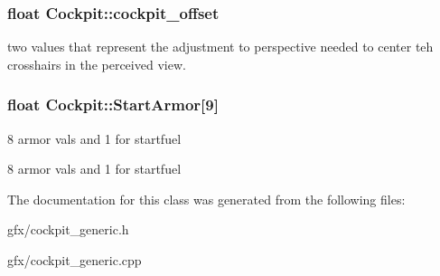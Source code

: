 \subsubsection[{\texorpdfstring{cockpit\+\_\+offset}{cockpit_offset}}]{\setlength{\rightskip}{0pt plus 5cm}float Cockpit\+::cockpit\+\_\+offset\hspace{0.3cm}{\ttfamily [protected]}}\hypertarget{classCockpit_abfd38e7f629da18799014c03912a8f7d}{}\label{classCockpit_abfd38e7f629da18799014c03912a8f7d}
two values that represent the adjustment to perspective needed to center teh crosshairs in the perceived view. 
\subsubsection[{\texorpdfstring{Start\+Armor}{StartArmor}}]{\setlength{\rightskip}{0pt plus 5cm}float Cockpit\+::\+Start\+Armor\mbox{[}9\mbox{]}\hspace{0.3cm}{\ttfamily [protected]}}\hypertarget{classCockpit_aa38272d3115d052d2c80bed75b97a12f}{}\label{classCockpit_aa38272d3115d052d2c80bed75b97a12f}


8 armor vals and 1 for startfuel 

8 armor vals and 1 for startfuel 

The documentation for this class was generated from the following files\+:\begin{DoxyCompactItemize}
\item 
gfx/cockpit\+\_\+generic.\+h\item 
gfx/cockpit\+\_\+generic.\+cpp\end{DoxyCompactItemize}
